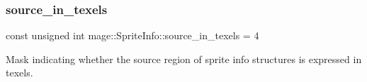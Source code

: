 \subsubsection{\texorpdfstring{source\+\_\+in\+\_\+texels}{source\_in\_texels}}
{\footnotesize\ttfamily const unsigned int mage\+::\+Sprite\+Info\+::source\+\_\+in\+\_\+texels = 4\hspace{0.3cm}{\ttfamily [static]}}

Mask indicating whether the source region of sprite info structures is expressed in texels. 